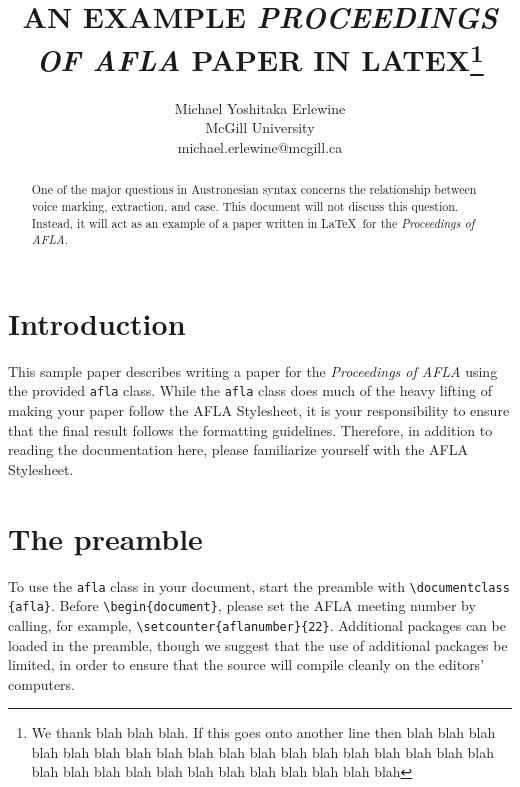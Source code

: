 \documentclass{afla}
\begin{document}
\title{\MakeUppercase{An example \textit{Proceedings of AFLA} paper in LaTeX}\thanks{We thank blah blah blah. If this goes onto another line then blah blah blah blah blah blah blah blah blah blah blah blah blah blah blah blah blah blah blah blah blah blah blah blah blah blah blah blah blah blah}}

\author{Michael Yoshitaka Erlewine\\
	McGill University\\
	michael.erlewine@mcgill.ca}


\maketitle

\begin{abstract}
One of the major questions in Austronesian syntax concerns the relationship between voice marking, extraction, and case. This document will not discuss this question. Instead, it will act as an example of a paper written in \LaTeX\ for the \textit{Proceedings of AFLA}.
\end{abstract}

\section{Introduction}

This sample paper describes writing a paper for the \textit{Proceedings of AFLA} using the provided \verb`afla` class. While the \verb`afla` class does much of the heavy lifting of making your paper follow the AFLA Stylesheet, it is your responsibility to ensure that the final result follows the formatting guidelines. Therefore, in addition to reading the documentation here, please familiarize yourself with the AFLA Stylesheet.

\section{The preamble}

To use the \verb`afla` class in your document, start the preamble with \verb`\documentclass` \verb`{afla}`. Before \verb`\begin{document}`, please set the AFLA meeting number by calling, for example, \verb`\setcounter{aflanumber}{22}`. Additional packages can be loaded in the preamble, though we suggest that the use of additional packages be limited, in order to ensure that the source will compile cleanly on the editors' computers.
\end{document}

